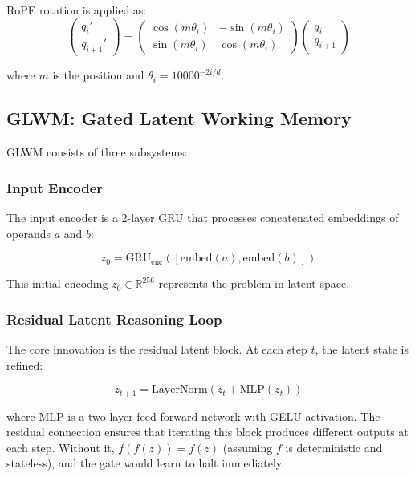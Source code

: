 \documentclass[11pt]{article}
\begin{document}
RoPE rotation is applied as:
\begin{equation}
\label{eq:rope}
\begin{pmatrix} q_i' \\ q_{i+1}' \end{pmatrix} = \begin{pmatrix} \cos(m\theta_i) & -\sin(m\theta_i) \\ \sin(m\theta_i) & \cos(m\theta_i) \end{pmatrix} \begin{pmatrix} q_i \\ q_{i+1} \end{pmatrix}
\end{equation}

where $m$ is the position and $\theta_i = 10000^{-2i/d}$.

\subsection{GLWM: Gated Latent Working Memory}

GLWM consists of three subsystems:

\subsubsection{Input Encoder}

The input encoder is a 2-layer GRU that processes concatenated embeddings of operands $a$ and $b$:

\begin{equation}
z_0 = \text{GRU}_{\text{enc}}([\text{embed}(a), \text{embed}(b)])
\end{equation}

This initial encoding $z_0 \in \mathbb{R}^{256}$ represents the problem in latent space.

\subsubsection{Residual Latent Reasoning Loop}

The core innovation is the residual latent block. At each step $t$, the latent state is refined:

\begin{equation}
\label{eq:latent}
z_{t+1} = \text{LayerNorm}(z_t + \text{MLP}(z_t))
\end{equation}

where $\text{MLP}$ is a two-layer feed-forward network with GELU activation. The residual connection ensures that iterating this block produces different outputs at each step. Without it, $f(f(z)) = f(z)$ (assuming $f$ is deterministic and stateless), and the gate would learn to halt immediately.
\end{document}
